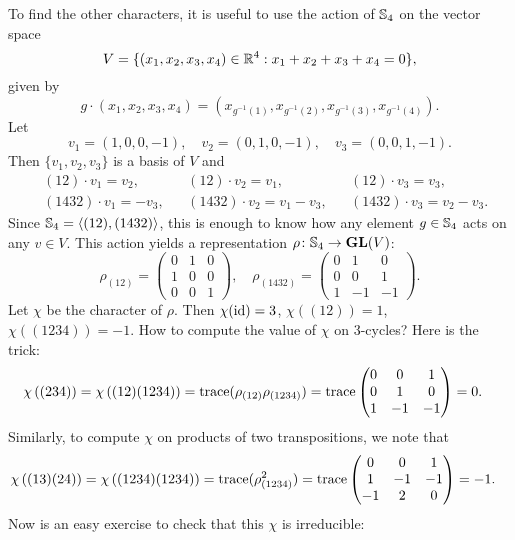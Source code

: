 \begin{example}
To find the other characters, it is useful to use the action of $\mathbb{S}_4$ on the vector space 
	\[
		V=\{(x_1,x_2,x_3,x_4)\in\mathbb{R}^4:x_1+x_2+x_3+x_4=0\},
	\]
given by 
\[
g\cdot (x_1,x_2,x_3,x_4)=(x_{g^{-1}(1)},x_{g^{-1}(2)},x_{g^{-1}(3)},x_{g^{-1}(4)}).
\]
Let \[
		v_1=(1,0,0,-1),
		\quad
		v_2=(0,1,0,-1),
		\quad
		v_3=(0,0,1,-1).
	\]
	Then $\{v_1,v_2,v_3\}$ is a basis of $V$ and 
	\begin{align*}
		&(12)\cdot v_1=v_2,&&
		(12)\cdot v_2=v_1,&&
		(12)\cdot v_3=v_3,\\
		&(1432)\cdot v_1=-v_3,&&
		(1432)\cdot v_2=v_1-v_3,&&
		(1432)\cdot v_3=v_2-v_3.
	\end{align*}
	Since $\mathbb{S}_4=\langle (12),(1432)\rangle$, this 
    is enough to know how any element 
    $g\in\mathbb{S}_4$ acts on any $v\in V$. 
    This action yields a representation 
    $\rho\colon\mathbb{S}_4\to\mathbf{GL}(V)$: 
    \[
		\rho_{(12)}=\begin{pmatrix}
			0 & 1 & 0\\
			1 & 0 & 0\\
			0 & 0 & 1
		\end{pmatrix},\quad
		\rho_{(1432)}=\begin{pmatrix}
			0 & 1 & 0\\
			0 & 0 & 1\\
			1 & -1 & -1
		\end{pmatrix}.
	\]
    Let $\chi$ be the character of $\rho$.  
	Then 
	$\chi(\operatorname{id})=3$, $\chi\left( (12) \right)=1$, $\chi\left( (1234) \right)=-1$. How to compute the value of $\chi$ on 3-cycles? Here is the trick: 
    \begin{align*}
		&\chi\left( (234) \right)=\chi\left( (12)(1234) \right)=\operatorname{trace}(\rho_{(12)}\rho_{(1234)})=\operatorname{trace}\begin{pmatrix}
			0 & 0 & 1\\
			0 & 1 & 0\\
			1 & -1 & -1
		\end{pmatrix}
		=0.
	\end{align*}
	Similarly, to compute $\chi$ on products of two transpositions, 
    we note that 
    \begin{align*}
		&\chi\left( (13)(24) \right)=\chi\left( (1234)(1234) \right)=\operatorname{trace}(\rho_{(1234)}^2)=\operatorname{trace}\begin{pmatrix}
			0 & 0 & 1\\
			1 & -1 & -1\\
			-1 & 2 & 0
		\end{pmatrix}
		=-1.
	\end{align*}
     Now is an easy exercise to check that this $\chi$ is irreducible:

\end{example}
